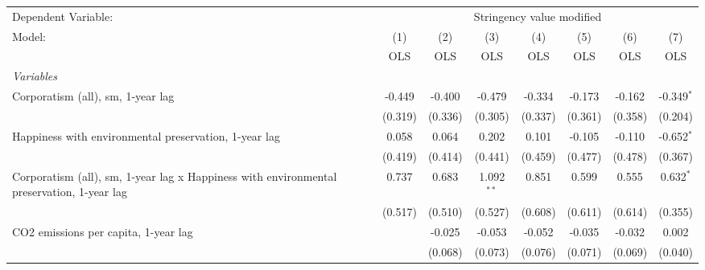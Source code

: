 
\begingroup
\centering
\begin{tabular}{lccccccc}
   \toprule
   Dependent Variable: & \multicolumn{7}{c}{Stringency value modified}\\
   Model:                                                                                    & (1)     & (2)     & (3)           & (4)           & (5)           & (6)           & (7)\\  
                                                                                             &  OLS    & OLS     & OLS           & OLS           & OLS           & OLS           & OLS\\  
   \midrule
   \emph{Variables}\\
   Corporatism (all), sm, 1-year lag                                                         & -0.449  & -0.400  & -0.479        & -0.334        & -0.173        & -0.162        & -0.349$^{*}$\\   
                                                                                             & (0.319) & (0.336) & (0.305)       & (0.337)       & (0.361)       & (0.358)       & (0.204)\\   
   Happiness with environmental preservation, 1-year lag                                     & 0.058   & 0.064   & 0.202         & 0.101         & -0.105        & -0.110        & -0.652$^{*}$\\   
                                                                                             & (0.419) & (0.414) & (0.441)       & (0.459)       & (0.477)       & (0.478)       & (0.367)\\   
   Corporatism (all), sm, 1-year lag x Happiness with environmental preservation, 1-year lag & 0.737   & 0.683   & 1.092$^{**}$  & 0.851         & 0.599         & 0.555         & 0.632$^{*}$\\   
                                                                                             & (0.517) & (0.510) & (0.527)       & (0.608)       & (0.611)       & (0.614)       & (0.355)\\   
   CO2 emissions per capita, 1-year lag                                                      &         & -0.025  & -0.053        & -0.052        & -0.035        & -0.032        & 0.002\\   
                                                                                             &         & (0.068) & (0.073)       & (0.076)       & (0.071)       & (0.069)       & (0.040)\\   

\end{tabular}
